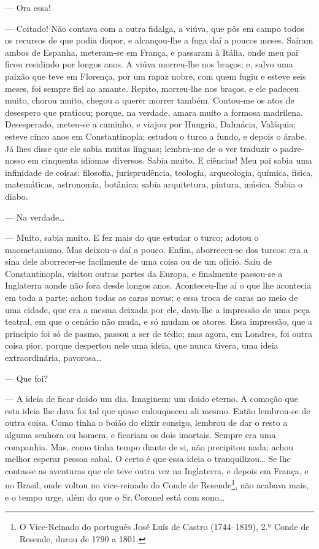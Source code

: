 --- Ora essa!

--- Coitado! Não contava com a outra fidalga, a viúva, que pôs em campo
todos os recursos de que podia dispor, e alcançou-lhe a fuga daí a
poucos meses. Saíram ambos de Espanha, meteram-se em França, e passaram
à Itália, onde meu pai ficou residindo por longos anos. A viúva
morreu-lhe nos braços; e, salvo uma paixão que teve em Florença, por um
rapaz nobre, com quem fugiu e esteve seis meses, foi sempre fiel ao
amante. Repito, morreu-lhe nos braços, e ele padeceu muito, chorou
muito, chegou a querer morrer também. Contou-me os atos de desespero que
praticou; porque, na verdade, amara muito a formosa madrilena.
Desesperado, meteu-se a caminho, e viajou por Hungria, Dalmácia,
Valáquia; esteve cinco anos em Constantinopla; estudou o turco a fundo,
e depois o árabe. Já lhes disse que ele sabia muitas línguas; lembra-me
de o ver traduzir o padre-nosso em cinquenta idiomas diversos. Sabia
muito. E ciências! Meu pai sabia uma infinidade de coisas: filosofia,
jurisprudência, teologia, arqueologia, química, física, matemáticas,
astronomia, botânica; sabia arquitetura, pintura, música. Sabia o diabo.

--- Na verdade\ldots{}

--- Muito, sabia muito. E fez mais do que estudar o turco; adotou o
maometanismo. Mas deixou-o daí a pouco. Enfim, aborreceu-se dos turcos:
era a sina dele aborrecer-se facilmente de uma coisa ou de um ofício.
Saiu de Constantinopla, visitou outras partes da Europa, e finalmente
passou-se a Inglaterra aonde não fora desde longos anos. Aconteceu-lhe
aí o que lhe acontecia em toda a parte: achou todas as caras novas; e
essa troca de caras no meio de uma cidade, que era a mesma deixada por
ele, dava-lhe a impressão de uma peça teatral, em que o cenário não
muda, e só mudam os atores. Essa impressão, que a princípio foi só de
pasmo, passou a ser de tédio; mas agora, em Londres, foi outra coisa
pior, porque despertou nele uma ideia, que nunca tivera, uma ideia
extraordinária, pavorosa\ldots{}

--- Que foi?

--- A ideia de ficar doido um dia. Imaginem: um doido eterno. A comoção
que esta ideia lhe dava foi tal que quase enlouqueceu ali mesmo. Então
lembrou-se de outra coisa. Como tinha o boião do elixir consigo, lembrou
de dar o resto a alguma senhora ou homem, e ficariam os dois imortais.
Sempre era uma companhia. Mas, como tinha tempo diante de si, não
precipitou nada; achou melhor esperar pessoa cabal. O certo é que essa
ideia o tranquilizou\ldots{} Se lhe contasse as aventuras que ele teve outra
vez na Inglaterra, e depois em França, e no Brasil, onde voltou no
vice-reinado do Conde de Resende\footnote{O Vice-Reinado do português
  José Luís de Castro (1744--1819), 2.º Conde de Resende, durou de 1790 a
  1801.}, não acabava mais, e o tempo urge, além do que o Sr.\,Coronel
está com sono\ldots{}

